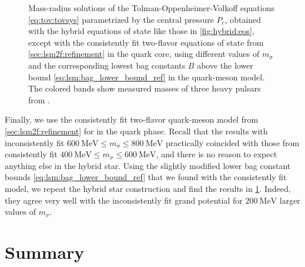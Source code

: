 \begin{figure}
\caption{\label{fig:hybrid:mass-radius-consistent}%
	Mass-radius solutions of the Tolman-Oppenheimer-Volkoff equations \eqref{eq:tov:tovsys} parametrized by the central pressure $P_c$,
	obtained with the hybrid equations of state like those in \cref{fig:hybrid:eos},
	except with the consistently fit two-flavor equations of state from \cref{sec:lsm2f:refinement} in the quark core,
	using different values of $m_\sigma$ and the corresponding lowest bag constants $B$ above the lower bound \eqref{eq:lsm:bag_lower_bound_ref} in the quark-meson model.
	The colored bands show measured masses of three heavy pulsars from \cite{ref:antoniadis,ref:arzoumanian,ref:fonseca}.
}
\end{figure}

Finally, we use the consistently fit two-flavor quark-meson model from \cref{sec:lsm2f:refinement} for in the quark phase.
Recall that the results with inconsistently fit $\SI{600}{\mega\electronvolt} \leq m_\sigma \leq \SI{800}{\mega\electronvolt}$
practically coincided with those from consistently fit $\SI{400}{\mega\electronvolt} \leq m_\sigma \leq \SI{600}{\mega\electronvolt}$,
and there is no reason to expect anything else in the hybrid star.
Using the slightly modified lower bag constant bounds \eqref{eq:lsm:bag_lower_bound_ref} that we found with the consistently fit model,
we repeat the hybrid star construction and find the results in \cref{fig:hybrid:mass-radius-consistent}.
Indeed, they agree very well with the inconsistently fit grand potential for $\SI{200}{\mega\electronvolt}$ larger values of $m_\sigma$.

\section{Summary}

